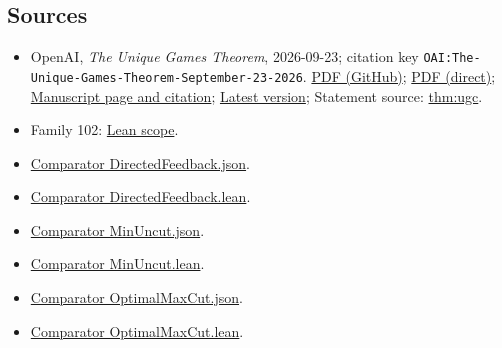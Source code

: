 \documentclass[11pt]{article}
\begin{document}
\subsection{Sources}
\begin{itemize}
\item OpenAI, \emph{The Unique Games Theorem}, 2026-09-23; citation key \texttt{OAI:The-Unique-Games-Theorem-September-23-2026}. \href{https://github.com/openai/math/blob/adc7f1241b42e322a6451854ab7e4b4c146bf78a/preprints/The-Unique-Games-Theorem-September-23-2026/paper.pdf}{PDF (GitHub)}; \href{https://github.com/openai/math/raw/adc7f1241b42e322a6451854ab7e4b4c146bf78a/preprints/The-Unique-Games-Theorem-September-23-2026/paper.pdf}{PDF (direct)}; \href{https://github.com/openai/math/blob/adc7f1241b42e322a6451854ab7e4b4c146bf78a/preprints/The-Unique-Games-Theorem-September-23-2026/README.md}{Manuscript page and citation}; \href{https://github.com/openai/math/blob/main/preprints/The-Unique-Games-Theorem-September-23-2026/paper.pdf}{Latest version}; Statement source: \href{https://github.com/openai/math/blob/adc7f1241b42e322a6451854ab7e4b4c146bf78a/preprints/The-Unique-Games-Theorem-September-23-2026/build/sections/00-introduction.tex\#L22}{thm:ugc}.
\item Family 102: \href{https://github.com/openai/math/blob/adc7f1241b42e322a6451854ab7e4b4c146bf78a/lean/docs/102.md}{Lean scope}.
\item \href{https://github.com/openai/math/blob/adc7f1241b42e322a6451854ab7e4b4c146bf78a/lean/ComparatorChallenges/DirectedFeedback.json}{Comparator DirectedFeedback.json}.
\item \href{https://github.com/openai/math/blob/adc7f1241b42e322a6451854ab7e4b4c146bf78a/lean/ComparatorChallenges/DirectedFeedback.lean}{Comparator DirectedFeedback.lean}.
\item \href{https://github.com/openai/math/blob/adc7f1241b42e322a6451854ab7e4b4c146bf78a/lean/ComparatorChallenges/MinUncut.json}{Comparator MinUncut.json}.
\item \href{https://github.com/openai/math/blob/adc7f1241b42e322a6451854ab7e4b4c146bf78a/lean/ComparatorChallenges/MinUncut.lean}{Comparator MinUncut.lean}.
\item \href{https://github.com/openai/math/blob/adc7f1241b42e322a6451854ab7e4b4c146bf78a/lean/ComparatorChallenges/OptimalMaxCut.json}{Comparator OptimalMaxCut.json}.
\item \href{https://github.com/openai/math/blob/adc7f1241b42e322a6451854ab7e4b4c146bf78a/lean/ComparatorChallenges/OptimalMaxCut.lean}{Comparator OptimalMaxCut.lean}.

\end{itemize}
\end{document}
